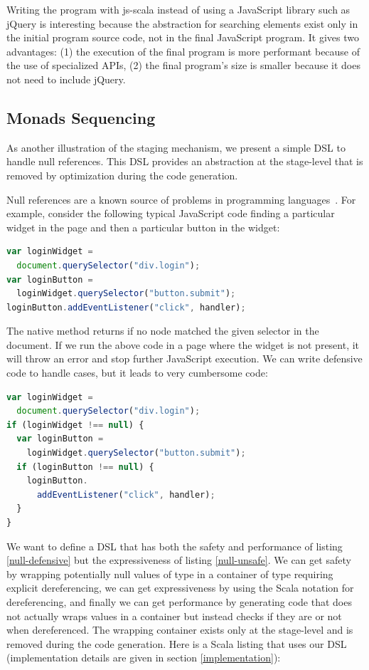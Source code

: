 \documentclass[preprint]{sigplanconf}
\begin{document}
Writing the program with js-scala instead of using a JavaScript library such as jQuery is interesting because the
abstraction for searching elements exist only in the initial program source code, not in the final JavaScript
program. It gives two advantages: (1) the execution of the final program is more performant because of the use of
specialized APIs, (2) the final program’s size is smaller because it does not need to include jQuery.

\subsection{Monads Sequencing}

As another illustration of the staging mechanism, we present a simple DSL to handle null references. This DSL
provides an abstraction at the stage-level that is removed by optimization during the code generation.

Null references are a known source of problems in programming languages~\cite{Hoare09_Null,Nanda09_Null}. For
example, consider the following typical JavaScript code finding a particular widget in the page and then a particular
button in the widget:

\begin{lstlisting}[language=JavaScript,label=null-unsafe,caption=Unsafe code]
var loginWidget =
  document.querySelector("div.login");
var loginButton =
  loginWidget.querySelector("button.submit");
loginButton.addEventListener("click", handler);
\end{lstlisting}

The native  method returns  if no node matched the given selector in the document. If
we run the above code in a page where the widget is not present, it will throw an error and stop further JavaScript
execution. We can write defensive code to handle  cases, but it leads to very cumbersome code:

\begin{lstlisting}[language=JavaScript,label=null-defensive,caption=Defensive programming to handle null references]
var loginWidget =
  document.querySelector("div.login");
if (loginWidget !== null) {
  var loginButton =
    loginWidget.querySelector("button.submit");
  if (loginButton !== null) {
    loginButton.
      addEventListener("click", handler);
  }
}
\end{lstlisting}

We want to define a DSL that has both the safety and performance of listing \ref{null-defensive} but the
expressiveness of listing \ref{null-unsafe}. We can get safety by wrapping potentially null values of type
 in a container of type  requiring explicit dereferencing, we can get
expressiveness by using the Scala  notation for dereferencing, and finally we can get performance by
generating code that does not actually wraps values in a container but instead checks if they are  or not
when dereferenced. The wrapping container exists only at the stage-level and is removed during the code generation.
Here is a Scala listing that uses our DSL (implementation details are given in section \ref{implementation}):
\end{document}

